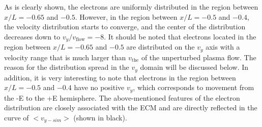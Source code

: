 \documentclass[draft,jgrga]{agutex2015}
\begin{document}
\begin{article}
As is clearly shown, the 
electrons are uniformly distributed 
in the region between $x/L =-0.65$ and $-0.5$.
However, in the region between $x/L =-0.5$ and $-0.4$, 
the velocity distribution starts to converge, 
and the center of the distribution decreases down to 
$v_y/v_{\mathrm{flow}}=-8$. 
It should be noted that 
electrons located in the region between $x/L =-0.65$ and $-0.5$
are distributed on the $v_y$ axis with a velocity range that is much larger 
than $v_{\mathrm{the}}$ of the unperturbed plasma flow. 
The reason for the distribution spread in the $v_{y}$ domain
will be discussed below.
In addition, it is very interesting to note that electrons
in the region between $x/L =-0.5$ and $-0.4$
have no positive $v_y$, which corresponds to movement 
from the -E to the +E hemisphere.
The above-mentioned features of the electron distribution are closely
associated with the ECM 
and are directly reflected in the curve of $<v_{y-sim}>$ (shown in black).



\end{article}
\end{document}
